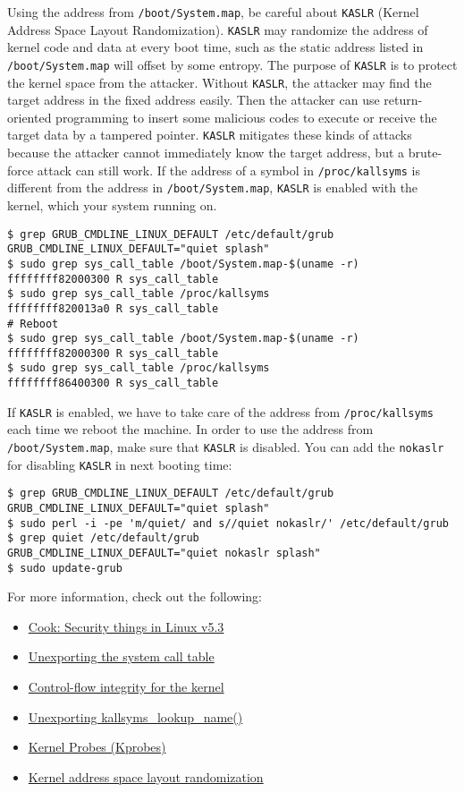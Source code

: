 \documentclass[10pt, oneside]{book}
\begin{document}
Using the address from \verb|/boot/System.map|, be careful about \verb|KASLR| (Kernel Address Space Layout Randomization).
\verb|KASLR| may randomize the address of kernel code and data at every boot time, such as the static address listed in \verb|/boot/System.map| will offset by some entropy.
The purpose of \verb|KASLR| is to protect the kernel space from the attacker.
Without \verb|KASLR|, the attacker may find the target address in the fixed address easily.
Then the attacker can use return-oriented programming to insert some malicious codes to execute or receive the target data by a tampered pointer.
\verb|KASLR| mitigates these kinds of attacks because the attacker cannot immediately know the target address, but a brute-force attack can still work.
If the address of a symbol in \verb|/proc/kallsyms| is different from the address in \verb|/boot/System.map|, \verb|KASLR| is enabled with the kernel, which your system running on.
\begin{verbatim}
$ grep GRUB_CMDLINE_LINUX_DEFAULT /etc/default/grub
GRUB_CMDLINE_LINUX_DEFAULT="quiet splash"
$ sudo grep sys_call_table /boot/System.map-$(uname -r)
ffffffff82000300 R sys_call_table
$ sudo grep sys_call_table /proc/kallsyms
ffffffff820013a0 R sys_call_table
# Reboot
$ sudo grep sys_call_table /boot/System.map-$(uname -r)
ffffffff82000300 R sys_call_table
$ sudo grep sys_call_table /proc/kallsyms 
ffffffff86400300 R sys_call_table
\end{verbatim}
If \verb|KASLR| is enabled, we have to take care of the address from \verb|/proc/kallsyms| each time we reboot the machine.
In order to use the address from \verb|/boot/System.map|, make sure that \verb|KASLR| is disabled.
You can add the \verb|nokaslr| for disabling \verb|KASLR| in next booting time:
\begin{verbatim}
$ grep GRUB_CMDLINE_LINUX_DEFAULT /etc/default/grub
GRUB_CMDLINE_LINUX_DEFAULT="quiet splash"
$ sudo perl -i -pe 'm/quiet/ and s//quiet nokaslr/' /etc/default/grub
$ grep quiet /etc/default/grub
GRUB_CMDLINE_LINUX_DEFAULT="quiet nokaslr splash"
$ sudo update-grub
\end{verbatim}

For more information, check out the following:

\begin{itemize}
 \item \href{https://lwn.net/Articles/804849/}{Cook: Security things in Linux v5.3}
 \item \href{https://lwn.net/Articles/12211/}{Unexporting the system call table}
 \item \href{https://lwn.net/Articles/810077/}{Control-flow integrity for the kernel}
 \item \href{https://lwn.net/Articles/813350/}{Unexporting kallsyms\_lookup\_name()}
 \item \href{https://www.kernel.org/doc/Documentation/kprobes.txt}{Kernel Probes (Kprobes)}
 \item \href{https://lwn.net/Articles/569635/}{Kernel address space layout randomization}
\end{itemize}
\end{document}

